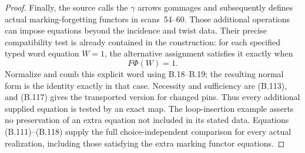 \begin{proof}
Finally, the source calls the $\gamma$ arrows gommages
and subsequently defines actual marking-forgetting
functors in scans~54--60.  Those additional operations
can impose equations beyond the incidence and twist
data.  Their precise compatibility test is already
contained in the construction: for each specified typed
word equation $W=1$, the alternative assignment satisfies
it exactly when
\[
                       F\Phi(W)=1.                            \tag{B.121}
\]
Normalize and comb this explicit word using B.18--B.19;
the resulting normal form is the identity exactly in
that case.  Necessity and sufficiency are (B.113), and
(B.117) gives the transported version for changed pins.
Thus every additional supplied equation is tested by
an exact map.  The loop-insertion example asserts no
preservation of an extra equation not included in its
stated data.  Equations (B.111)--(B.118) supply the full
choice-independent comparison for every actual
realization, including those satisfying the extra
marking functor equations.
\end{proof}
